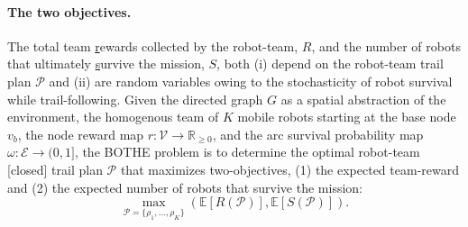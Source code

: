 \documentclass[11pt, oneside]{article}
\begin{document}
\paragraph{The two objectives.}
The total team \underline{r}ewards collected by the robot-team, $R$, and the number of robots that ultimately \underline{s}urvive the mission, $S$, both (i) depend on the robot-team trail plan $\mathcal{P}$ and (ii) are random variables owing to the stochasticity of robot survival while trail-following.
Given 
the directed graph $G$ as a spatial abstraction of the environment, 
the homogenous team of $K$ mobile robots starting at the base node $v_b$,
the node reward map $r: \mathcal{V} \rightarrow \mathbb{R}_{\geq 0}$, and the arc survival probability map $\omega : \mathcal{E} \rightarrow (0, 1]$, 
the BOTHE problem is to determine the optimal robot-team [closed] trail plan $\mathcal{P}$ that maximizes two-objectives, (1) the expected team-reward and (2) the expected number of robots that survive the mission:
\begin{equation}
\max_{\mathcal{P}=\{\rho_1, ..., \rho_K\}} \left( \mathbb{E}[R(\mathcal{P})], \mathbb{E}[S(\mathcal{P})] \right).
\label{eq:the_two_objs}
\end{equation}

%
%
\end{document}
